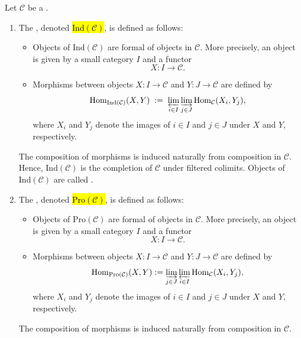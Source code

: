 \begin{definition} \label{definition:ind_pro_category_of_a_locally_small_category}
Let $\mathcal{C}$ be a .

\begin{enumerate}
    \item  The , denoted \hl{$\mathrm{Ind}(\mathcal{C})$}, is defined as follows:
    \begin{itemize}
        \item Objects of $\mathrm{Ind}(\mathcal{C})$ are formal  of objects in $\mathcal{C}$. More precisely, an object is given by a  small category $I$ and a functor 
        $$ X : I \to \mathcal{C}.  $$
        \item Morphisms between objects $X : I \to \mathcal{C}$ and $Y : J \to \mathcal{C}$ are defined by
        $$ \mathrm{Hom}_{\mathrm{Ind}(\mathcal{C})}(X,Y) \;:=\; \varprojlim_{i \in I} \varinjlim_{j \in J} \mathrm{Hom}_{\mathcal{C}}(X_i, Y_j), $$
        where $X_i$ and $Y_j$ denote the images of $i \in I$ and $j \in J$ under $X$ and $Y$, respectively.
    \end{itemize}
    The composition of morphisms is induced naturally from composition in $\mathcal{C}$.  
    Hence, $\mathrm{Ind}(\mathcal{C})$ is the completion of $\mathcal{C}$ under filtered colimits. Objects of $\mathrm{Ind}(\mathcal{C})$ are called .
    
    \item 
    The , denoted \hl{$\mathrm{Pro}(\mathcal{C})$}, is defined as follows:
    \begin{itemize}
        \item Objects of \(\mathrm{Pro}(\mathcal{C})\) are formal  of objects in \(\mathcal{C}\). More precisely, an object is given by a  small category \(I\) and a functor
        \[
        X : I \to \mathcal{C}.
        \]
        \item Morphisms between objects \(X : I \to \mathcal{C}\) and \(Y : J \to \mathcal{C}\) are defined by
        \[
        \mathrm{Hom}_{\mathrm{Pro}(\mathcal{C})}(X,Y) := \varinjlim_{j \in J} \varprojlim_{i \in I} \mathrm{Hom}_{\mathcal{C}}(X_i, Y_j),
        \]
        where \(X_i\) and \(Y_j\) denote the images of \(i \in I\) and \(j \in J\) under \(X\) and \(Y\), respectively.
    \end{itemize}
    The composition of morphisms is induced naturally from composition in \(\mathcal{C}\).


\end{enumerate}
\end{definition}

